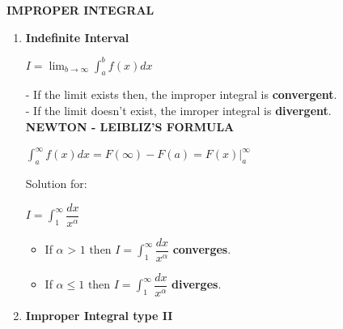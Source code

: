 \documentclass[10pt]{article}
\begin{document}
\pagebreak
\begin{center}
\textbf{IMPROPER INTEGRAL}
\end{center}
\begin{enumerate}
	\item \textbf{Indefinite Interval}\\
	 \begin{mybox}
	 \begin{center}
	 $I = \displaystyle \lim_{b \to \infty} \int_{a}^{b} f(x)dx$
	 \end{center}
	 \end{mybox}
	 - If the limit exists then, the improper integral is \textbf{convergent}.\\
	 - If the limit doesn't exist, the imroper integral is \textbf{divergent}.\\
	 \textbf{NEWTON - LEIBLIZ'S FORMULA}\\
	 \begin{mybox}
	 \begin{center}
	 $ \displaystyle \int_{a}^{\infty} f(x)dx = F(\infty) - F(a) = F(x)|_a^{\infty}$
	 \end{center}
	 \end{mybox}
	 Solution for:
	 \begin{center}
	 $I = \displaystyle \int_{1}^{\infty} \dfrac{dx}{x^{\alpha}}$
	 \end{center}
	 \begin{itemize}
	 \item If $\alpha \mbox{ > 1 then } I = \displaystyle \int_{1}^{\infty} \dfrac{dx}{x^{\alpha}}$ \textbf{converges}.
	 \item If $\alpha \le 1 \mbox{ then } I = \displaystyle \int_{1}^{\infty} \dfrac{dx}{x^{\alpha}}$ \textbf{diverges}.
	 \end{itemize}
	 \item \textbf{Improper Integral type II}\\
\end{enumerate}  
\end{document}
